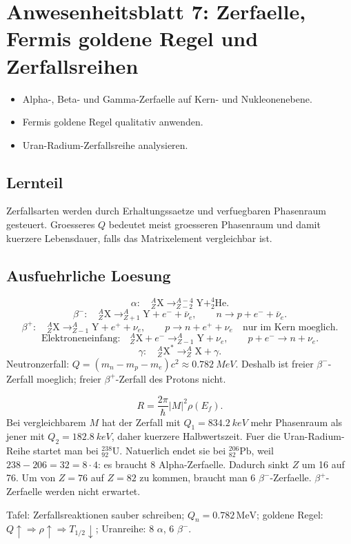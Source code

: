 \documentclass[11pt,a4paper]{scrartcl}
\newcommand{\abs}[1]{\left|#1\right|}
\newcommand{\nuclide}[3]{^{#1}_{#2}\mathrm{#3}}
\begin{document}
\section{Anwesenheitsblatt 7: Zerfaelle, Fermis goldene Regel und Zerfallsreihen}
\begin{taskbox}\begin{itemize}\item Alpha-, Beta- und Gamma-Zerfaelle auf Kern- und Nukleonenebene.\item Fermis goldene Regel qualitativ anwenden.\item Uran-Radium-Zerfallsreihe analysieren.\end{itemize}\end{taskbox}
\subsection{Lernteil}\begin{learningbox}Zerfallsarten werden durch Erhaltungssaetze und verfuegbaren Phasenraum gesteuert. Groesseres \(Q\) bedeutet meist groesseren Phasenraum und damit kuerzere Lebensdauer, falls das Matrixelement vergleichbar ist.\end{learningbox}
\subsection{Ausfuehrliche Loesung}
\begin{calculationbox}[title={Zerfallsreaktionen}]
\[\alpha:\quad \nuclide{A}{Z}{X}\to\nuclide{A-4}{Z-2}{Y}+\nuclide{4}{2}{He}.\]
\[\beta^-:\quad \nuclide{A}{Z}{X}\to\nuclide{A}{Z+1}{Y}+e^-+\bar\nu_e,\qquad n\to p+e^-+\bar\nu_e.\]
\[\beta^+:\quad \nuclide{A}{Z}{X}\to\nuclide{A}{Z-1}{Y}+e^++\nu_e,\qquad p\to n+e^++\nu_e\quad\text{nur im Kern moeglich}.\]
\[\text{Elektroneneinfang:}\quad \nuclide{A}{Z}{X}+e^-\to\nuclide{A}{Z-1}{Y}+\nu_e,\qquad p+e^-\to n+\nu_e.\]
\[\gamma:\quad \nuclide{A}{Z}{X}^{\ast}\to\nuclide{A}{Z}{X}+\gamma.\]
Neutronzerfall: \(Q=(m_n-m_p-m_e)c^2\approx\SI{0.782}{MeV}\). Deshalb ist freier \(\beta^-\)-Zerfall moeglich; freier \(\beta^+\)-Zerfall des Protons nicht.
\end{calculationbox}
\begin{calculationbox}[title={Fermis goldene Regel und Zerfallsreihe}]
\[R=\frac{2\pi}{\hbar}\abs{M}^2\rho(E_f).\]
Bei vergleichbarem \(M\) hat der Zerfall mit \(Q_1=\SI{834.2}{keV}\) mehr Phasenraum als jener mit \(Q_2=\SI{182.8}{keV}\), daher kuerzere Halbwertszeit.
Fuer die Uran-Radium-Reihe startet man bei \(\nuclide{238}{92}{U}\). Natuerlich endet sie bei \(\nuclide{206}{82}{Pb}\), weil \(238-206=32=8\cdot4\): es braucht 8 Alpha-Zerfaelle. Dadurch sinkt \(Z\) um 16 auf 76. Um von \(Z=76\) auf \(Z=82\) zu kommen, braucht man 6 \(\beta^-\)-Zerfaelle. \(\beta^+\)-Zerfaelle werden nicht erwartet.
\end{calculationbox}
\begin{talkbox}Tafel: Zerfallsreaktionen sauber schreiben; \(Q_n=0.782\,\mathrm{MeV}\); goldene Regel: \(Q\uparrow\Rightarrow\rho\uparrow\Rightarrow T_{1/2}\downarrow\); Uranreihe: 8 \(\alpha\), 6 \(\beta^-\).\end{talkbox}
\end{document}
